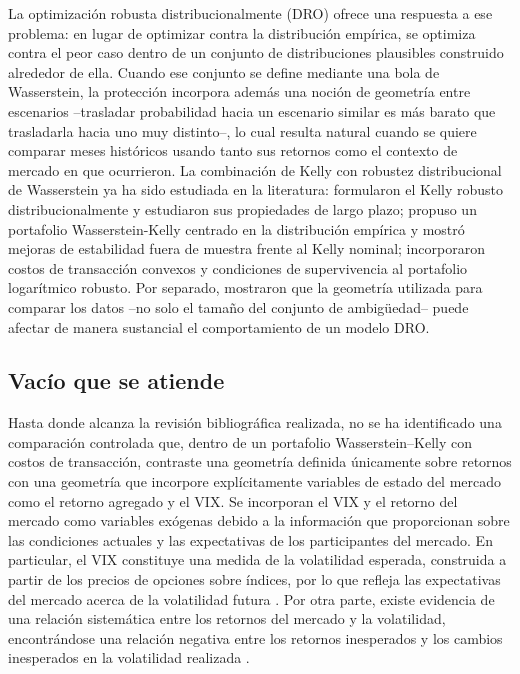 \documentclass[11pt]{article}
\begin{document}
La optimización robusta distribucionalmente (DRO) ofrece una respuesta a ese problema:
en lugar de optimizar contra la distribución empírica, se optimiza contra el peor caso dentro
de un conjunto de distribuciones plausibles construido alrededor de ella. Cuando ese
conjunto se define mediante una bola de Wasserstein, la protección incorpora además una
noción de geometría entre escenarios --trasladar probabilidad hacia un escenario similar es
más barato que trasladarla hacia uno muy distinto--, lo cual resulta natural cuando se quiere
comparar meses históricos usando tanto sus retornos como el contexto de mercado en que
ocurrieron. La combinación de Kelly con robustez distribucional de Wasserstein ya ha sido estudiada en la literatura: \citet{sunboyd2018} formularon el Kelly robusto distribucionalmente y
estudiaron sus propiedades de largo plazo; \citet{li2023} propuso un portafolio Wasserstein-Kelly
centrado en la distribución empírica y mostró mejoras de estabilidad fuera de muestra frente
al Kelly nominal; \citet{hsiehyu2024} incorporaron costos de transacción convexos y
condiciones de supervivencia al portafolio logarítmico robusto. Por separado, \citet{liu2022}
mostraron que la geometría utilizada para comparar los datos --no solo el tamaño del
conjunto de ambigüedad-- puede afectar de manera sustancial el comportamiento de un
modelo DRO.

\subsection{Vacío que se atiende}\label{sec:vacio}

Hasta donde alcanza la revisión bibliográfica realizada, no se ha identificado una comparación controlada que, dentro de un portafolio Wasserstein–Kelly con costos de transacción, contraste una geometría definida únicamente sobre retornos con una geometría que incorpore explícitamente variables de estado del mercado como el retorno agregado y el VIX. Se incorporan el VIX y el retorno del mercado como variables exógenas debido a la información que proporcionan sobre las condiciones actuales y las expectativas de los participantes del mercado. En particular, el VIX constituye una medida de la volatilidad esperada, construida a partir de los precios de opciones sobre índices, por lo que refleja las expectativas del mercado acerca de la volatilidad futura \citep{whaley2000}. Por otra parte, existe evidencia de una relación sistemática entre los retornos del mercado y la volatilidad, encontrándose una relación negativa entre los retornos inesperados y los 
cambios inesperados en la volatilidad realizada \citep{french1987}.
 
\end{document}
